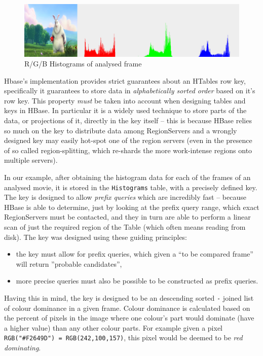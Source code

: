 \begin{figure}[ch!]
  \centering
  \includegraphics[width=\textwidth]{img/Histograms__Big_Buck_Bunny_mirror_png.png}
  \caption{R/G/B Histograms of analysed frame}
\end{figure}

Hbase's implementation provides strict guarantees about an HTables row key, specifically it guarantees to store data in \textit{alphabetically sorted order} based on it's row key. This property \textit{must} be taken into account when designing tables and keys in HBase. In particular it is a widely used technique to store parts of the data, or projections of it, directly in the key itself -- this is because HBase relies so much on the key to distribute data among RegionServers and a wrongly designed key may easily hot-spot one of the region servers (even in the presence of so called region-splitting, which re-shards the more work-intense regions onto multiple servers).

In our example, after obtaining the histogram data for each of the frames of an analysed movie, it is stored in the \verb|Histograms| table, with a precisely defined key. The key is designed to allow \textit{prefix queries} which are incredibly fast -- because HBase is able to determine, just by looking at the prefix query range, which exact RegionServers must be contacted, and they in turn are able to perform a linear scan of just the required region of the Table (which often means reading from disk). The key was designed using these guiding principles:

\begin{itemize}
 \item the key must allow for prefix queries, which given a ``to be compared frame'' will return ''probable candidates'',
 \item more precise queries must also be possible to be constructed as prefix queries.
\end{itemize}

Having this in mind, the key is designed to be an descending sorted \verb|-| joined list of colour dominance in a given frame. Colour dominance is calculated based on the percent of pixels in the image where one colour's part would dominate (have a higher value) than any other colour parts. For example given a pixel  \verb|RGB("#F2649D") = RGB(242,100,157)|, this pixel would be deemed to be \textit{red dominating}. 

